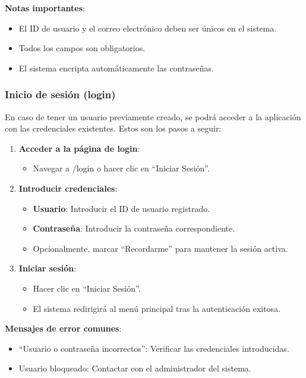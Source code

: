 \textbf{Notas importantes}:
\begin{itemize}
   \item El ID de usuario y el correo electrónico deben ser únicos en el sistema.
   \item Todos los campos son obligatorios.
   \item El sistema encripta automáticamente las contraseñas.
\end{itemize}

\subsubsection{Inicio de sesión (login)}
En caso de tener un usuario previamente creado, se podrá acceder a la aplicación con las credenciales existentes. Estos son los pasos a seguir:

\begin{enumerate}
   \item \textbf{Acceder a la página de login}:

   \begin{itemize}
      \item Navegar a /login o hacer clic en ``Iniciar Sesión''.
   \end{itemize}
   \item \textbf{Introducir credenciales}:
   \begin{itemize}
      \item \textbf{Usuario}: Introducir el ID de usuario registrado.
      \item \textbf{Contraseña}: Introducir la contraseña correspondiente.
      \item Opcionalmente, marcar ``Recordarme'' para mantener la sesión activa.
   \end{itemize}
   \item \textbf{Iniciar sesión}:
   \begin{itemize}
      \item Hacer clic en ``Iniciar Sesión''.
      \item El sistema redirigirá al menú principal tras la autenticación exitosa.
   \end{itemize}
\end{enumerate}

\textbf{Mensajes de error comunes}:
\begin{itemize}
   \item ``Usuario o contraseña incorrectos'': Verificar las credenciales introducidas.
   \item Usuario bloqueado: Contactar con el administrador del sistema.
\end{itemize}

